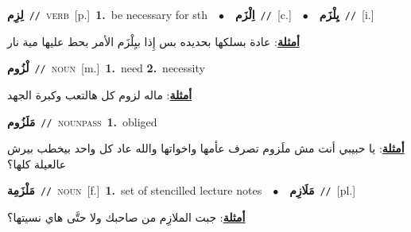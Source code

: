 \documentclass[10pt,a4paper,twoside]{article} %
\begin{document}
\begin{multicols}{2}
{\setlength\topsep{0pt}\textbf{\foreignlanguage{arabic}{لِزِم}}\ {\color{gray}\texttt{//}\color{black}}\ \textsc{verb}\ [p.]\ \textbf{1.}~be necessary for sth\ \ $\bullet$\ \ \setlength\topsep{0pt}\textbf{\foreignlanguage{arabic}{اِلْزَم}}\ {\color{gray}\texttt{//}\color{black}}\ [c.]\ \ $\bullet$\ \ \setlength\topsep{0pt}\textbf{\foreignlanguage{arabic}{يِلْزَم}}\ {\color{gray}\texttt{//}\color{black}}\ [i.]\  \begin{flushright}\color{gray}\foreignlanguage{arabic}{\textbf{\underline{\foreignlanguage{arabic}{أمثلة}}}: عادة بسلكها بحديده بس إِذا بيِلْزَم الأمر بحط عليها مية نار}\end{flushright}\color{black}} \vspace{2mm}

{\setlength\topsep{0pt}\textbf{\foreignlanguage{arabic}{لْزُوم}}\ {\color{gray}\texttt{//}\color{black}}\ \textsc{noun}\ [m.]\ \textbf{1.}~need  \textbf{2.}~necessity\  \begin{flushright}\color{gray}\foreignlanguage{arabic}{\textbf{\underline{\foreignlanguage{arabic}{أمثلة}}}: ماله لزوم كل هالتعب وكبرة الجهد}\end{flushright}\color{black}} \vspace{2mm}

{\setlength\topsep{0pt}\textbf{\foreignlanguage{arabic}{مَلَزُوم}}\ {\color{gray}\texttt{//}\color{black}}\ \textsc{noun\textunderscore pass}\ \textbf{1.}~obliged\  \begin{flushright}\color{gray}\foreignlanguage{arabic}{\textbf{\underline{\foreignlanguage{arabic}{أمثلة}}}: يا حبيبي أنت مش ملَزوم تصرف عأمها واخواتها والله عاد كل واحد بيخطب بيرش عالعيلة كلها؟}\end{flushright}\color{black}} \vspace{2mm}

{\setlength\topsep{0pt}\textbf{\foreignlanguage{arabic}{مَلْزَمِة}}\ {\color{gray}\texttt{//}\color{black}}\ \textsc{noun}\ [f.]\ \textbf{1.}~set of stencilled lecture notes\ \ $\bullet$\ \ \setlength\topsep{0pt}\textbf{\foreignlanguage{arabic}{مَلَازِم}}\ {\color{gray}\texttt{//}\color{black}}\ [pl.]\  \begin{flushright}\color{gray}\foreignlanguage{arabic}{\textbf{\underline{\foreignlanguage{arabic}{أمثلة}}}: جبت الملازِم من صاحبك ولا حتَّى هاي نسيتها؟}\end{flushright}\color{black}} \vspace{2mm}


\end{multicols}
\end{document}
